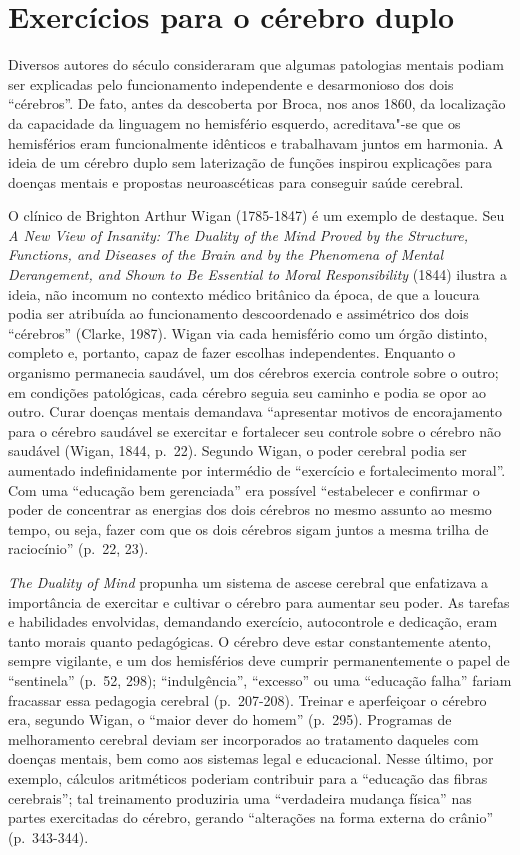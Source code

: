 \chapter{Exercícios para o cérebro duplo}

Diversos autores do século  consideraram que algumas patologias
mentais podiam ser explicadas pelo funcionamento independente e
desarmonioso dos dois ``cérebros''. De fato, antes da descoberta por
Broca, nos anos 1860, da localização da capacidade da linguagem no
hemisfério esquerdo, acreditava"-se que os hemisférios eram
funcionalmente idênticos e trabalhavam juntos em harmonia. A ideia de um
cérebro duplo sem laterização de funções inspirou explicações para
doenças mentais e propostas neuroascéticas para conseguir saúde
cerebral.

O clínico de Brighton Arthur Wigan (1785-1847) é um exemplo de destaque.
Seu \emph{A New View of Insanity: The Duality of the Mind Proved by the
Structure, Functions, and Diseases of the Brain and by the Phenomena of
Mental Derangement, and Shown to Be Essential to Moral Responsibility}
(1844) ilustra a ideia, não incomum no contexto médico britânico da
época, de que a loucura podia ser atribuída ao funcionamento
descoordenado e assimétrico dos dois ``cérebros'' (Clarke, 1987). Wigan
via cada hemisfério como um órgão distinto, completo e, portanto, capaz
de fazer escolhas independentes. Enquanto o organismo permanecia
saudável, um dos cérebros exercia controle sobre o outro; em condições
patológicas, cada cérebro seguia seu caminho e podia se opor ao outro.
Curar doenças mentais demandava ``apresentar motivos de encorajamento
para o cérebro saudável se exercitar e fortalecer seu controle sobre o
cérebro não saudável (Wigan, 1844, p.~22). Segundo Wigan, o poder
cerebral podia ser aumentado indefinidamente por intermédio de
``exercício e fortalecimento moral''. Com uma ``educação bem
gerenciada'' era possível ``estabelecer e confirmar o poder de
concentrar as energias dos dois cérebros no mesmo assunto ao mesmo
tempo, ou seja, fazer com que os dois cérebros sigam juntos a mesma
trilha de raciocínio'' (p.~22, 23).

\emph{The Duality of Mind} propunha um sistema de ascese cerebral que
enfatizava a importância de exercitar e cultivar o cérebro para aumentar
seu poder. As tarefas e habilidades envolvidas, demandando exercício,
autocontrole e dedicação, eram tanto morais quanto pedagógicas. O
cérebro deve estar constantemente atento, sempre vigilante, e um dos
hemisférios deve cumprir permanentemente o papel de ``sentinela'' (p.~52,
298); ``indulgência'', ``excesso'' ou uma ``educação falha'' fariam
fracassar essa pedagogia cerebral (p.~207-208). Treinar e aperfeiçoar o
cérebro era, segundo Wigan, o ``maior dever do homem'' (p.~295).
Programas de melhoramento cerebral deviam ser incorporados ao tratamento
daqueles com doenças mentais, bem como aos sistemas legal e educacional.
Nesse último, por exemplo, cálculos aritméticos poderiam contribuir para
a ``educação das fibras cerebrais''; tal treinamento produziria uma
``verdadeira mudança física'' nas partes exercitadas do cérebro, gerando
``alterações na forma externa do crânio'' (p.~343-344).

